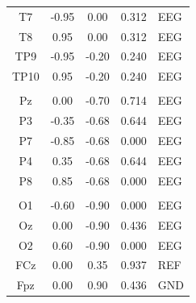 \begin{table}[htbp]
\begin{tabular}{@{}cc c c l@{}}
T7   & -0.95 &  0.00 & 0.312 & EEG \\
T8   & 0.95 &  0.00 & 0.312 & EEG \\
TP9  & -0.95 & -0.20 & 0.240 & EEG \\
TP10 & 0.95 & -0.20 & 0.240 & EEG \\
\addlinespace
\multicolumn{5}{@{}l}{\textit{Parietal}} \\
Pz   & 0.00 & -0.70 & 0.714 & EEG \\
P3   & -0.35 & -0.68 & 0.644 & EEG \\
P7   & -0.85 & -0.68 & 0.000 & EEG \\
P4   & 0.35 & -0.68 & 0.644 & EEG \\
P8   & 0.85 & -0.68 & 0.000 & EEG \\
\addlinespace
\multicolumn{5}{@{}l}{\textit{Occipital}} \\
O1   & -0.60 & -0.90 & 0.000 & EEG \\
Oz   & 0.00 & -0.90 & 0.436 & EEG \\
O2   & 0.60 & -0.90 & 0.000 & EEG \\
\addlinespace
FCz  & 0.00 & 0.35 & 0.937 & REF \\
Fpz  & 0.00 & 0.90 & 0.436 & GND \\
\bottomrule
\end{tabular}
\end{table}
